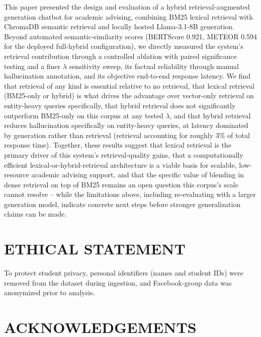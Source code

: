 \documentclass[a4paper,twoside]{article}
\begin{document}
This paper presented the design and evaluation of a hybrid retrieval-augmented generation chatbot for academic advising, combining BM25 lexical retrieval with ChromaDB semantic retrieval and locally hosted Llama-3.1-8B generation. Beyond automated semantic-similarity scores (BERTScore 0.921, METEOR 0.594 for the deployed full-hybrid configuration), we directly measured the system's retrieval contribution through a controlled ablation with paired significance testing and a finer $\lambda$ sensitivity sweep, its factual reliability through manual hallucination annotation, and its objective end-to-end response latency. We find that retrieval of any kind is essential relative to no retrieval, that lexical retrieval (BM25-only or hybrid) is what drives the advantage over vector-only retrieval on entity-heavy queries specifically, that hybrid retrieval does not significantly outperform BM25-only on this corpus at any tested $\lambda$, and that hybrid retrieval reduces hallucination specifically on entity-heavy queries, at latency dominated by generation rather than retrieval (retrieval accounting for roughly 3\% of total response time). Together, these results suggest that lexical retrieval is the primary driver of this system's retrieval-quality gains, that a computationally efficient lexical-or-hybrid-retrieval architecture is a viable basis for scalable, low-resource academic advising support, and that the specific value of blending in dense retrieval on top of BM25 remains an open question this corpus's scale cannot resolve -- while the limitations above, including re-evaluating with a larger generation model, indicate concrete next steps before stronger generalization claims can be made.

\section*{\uppercase{Ethical Statement}}

To protect student privacy, personal identifiers (names and student IDs) were removed from the dataset during ingestion, and Facebook-group data was anonymized prior to analysis.

\section*{\uppercase{Acknowledgements}}
\end{document}
